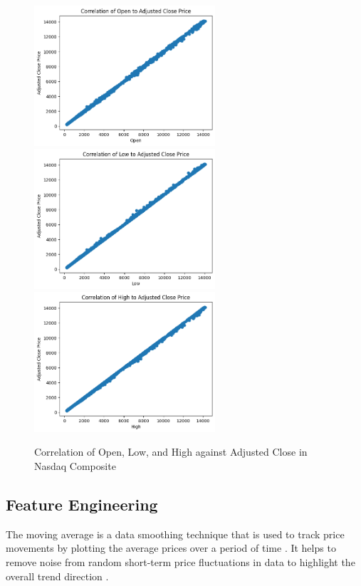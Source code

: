\documentclass[a4paper, 11pt]{article}
\begin{document}
\begin{figure}
    \begin{center}
        \includegraphics[width=0.6\textwidth]{Correlation of Open to Adjusted Close Price.png}
        \includegraphics[width=0.6\textwidth]{Correlation of Low to Adjusted Close Price.png}
        \includegraphics[width=0.6\textwidth]{Correlation of High to Adjusted Close Price.png}
        \caption{Correlation of Open, Low, and High against Adjusted Close in Nasdaq Composite}
    \end{center}
\end{figure}


\subsection{Feature Engineering}
The moving average is a data smoothing technique that is used to track price movements by plotting the average prices over a period of time \cite{movingAverageChart}. It helps to  remove noise from random short-term price fluctuations in data to highlight the overall trend direction \cite{movingAverageChart}.
\end{document}
